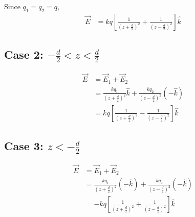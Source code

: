\documentclass{article}
\begin{document}
Since $q_1 = q_2 = q$,
\begin{align*}
\vec{E} &= k q \left[ \frac{1}{\left(z + \frac{d}{2}\right)^2} + \frac{1}{\left(z - \frac{d}{2}\right)^2} \right] \hat{k}
\end{align*}

\subsection*{Case 2: $-\frac{d}{2} < z < \frac{d}{2}$}
\begin{align*}
\vec{E} &= \vec{E}_1 + \vec{E}_2 \\
&= \frac{k q_1}{\left(z + \frac{d}{2}\right)^2} \hat{k} + \frac{k q_2}{\left(z - \frac{d}{2}\right)^2} (-\hat{k}) \\
&= k q \left[ \frac{1}{\left(z + \frac{d}{2}\right)^2} - \frac{1}{\left(z - \frac{d}{2}\right)^2} \right] \hat{k}
\end{align*}

\subsection*{Case 3: $z < -\frac{d}{2}$}
\begin{align*}
\vec{E} &= \vec{E}_1 + \vec{E}_2 \\
&= \frac{k q_1}{\left(z + \frac{d}{2}\right)^2} (-\hat{k}) + \frac{k q_2}{\left(z - \frac{d}{2}\right)^2} (-\hat{k}) \\
&= -k q \left[ \frac{1}{\left(z + \frac{d}{2}\right)^2} + \frac{1}{\left(z - \frac{d}{2}\right)^2} \right] \hat{k}
\end{align*}
\end{document}
